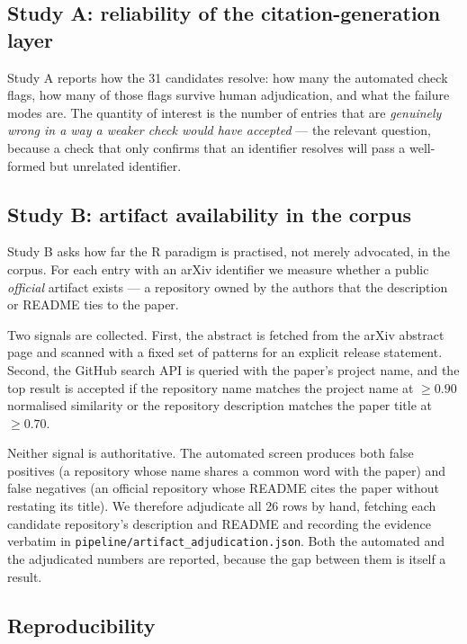 \documentclass[11pt,a4paper]{article}
\newcommand{\paradigmR}{\textsf{R}}
\begin{document}
\subsection{Study A: reliability of the citation-generation layer}

Study A reports how the 31 candidates resolve: how many the automated check
flags, how many of those flags survive human adjudication, and what the failure
modes are. The quantity of interest is the number of entries that are
\emph{genuinely wrong in a way a weaker check would have accepted} --- the
relevant question, because a check that only confirms that an identifier
resolves will pass a well-formed but unrelated identifier.

\subsection{Study B: artifact availability in the corpus}

Study B asks how far the \paradigmR{} paradigm is practised, not merely
advocated, in the corpus. For each entry with an arXiv identifier we measure
whether a public \emph{official} artifact exists --- a repository owned by the
authors that the description or README ties to the paper.

Two signals are collected. First, the abstract is fetched from the arXiv
abstract page and scanned with a fixed set of patterns for an explicit release
statement. Second, the GitHub search API is queried with the paper's project
name, and the top result is accepted if the repository name matches the project
name at $\geq 0.90$ normalised similarity or the repository description matches
the paper title at $\geq 0.70$.

Neither signal is authoritative. The automated screen produces both false
positives (a repository whose name shares a common word with the paper) and
false negatives (an official repository whose README cites the paper without
restating its title). We therefore adjudicate all 26 rows by hand, fetching
each candidate repository's description and README and recording the evidence
verbatim in \texttt{pipeline/artifact\_adjudication.json}. Both the automated
and the adjudicated numbers are reported, because the gap between them is
itself a result.

\subsection{Reproducibility}
\end{document}
